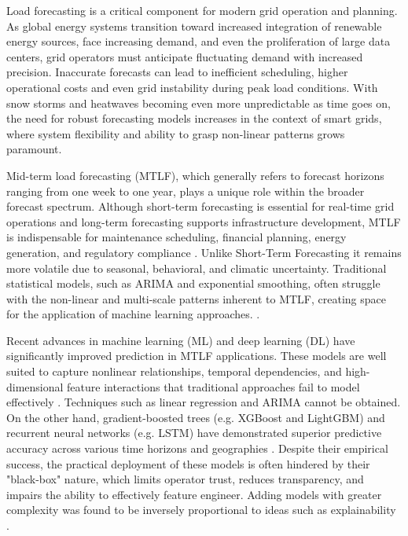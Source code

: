\documentclass[final,numbered]{ifacconf}
\begin{document}
Load forecasting is a critical component for modern grid operation and planning. As global energy systems transition toward increased integration of renewable energy sources, face increasing demand, and even the proliferation of large data centers, grid operators must anticipate fluctuating demand with increased precision. Inaccurate forecasts can lead to inefficient scheduling, higher operational costs and even grid instability during peak load conditions. With snow storms and heatwaves becoming even more unpredictable as time goes on, the need for robust forecasting models increases in the context of smart grids, where system flexibility and ability to grasp non-linear patterns grows paramount.

Mid-term load forecasting (MTLF), which generally refers to forecast horizons ranging from one week to one year, plays a unique role within the broader forecast spectrum. Although short-term forecasting is essential for real-time grid operations and long-term forecasting supports infrastructure development, MTLF is indispensable for maintenance scheduling, financial planning, energy generation, and regulatory compliance \cite{yin2023mid}. Unlike Short-Term Forecasting it remains more volatile  due to seasonal, behavioral, and climatic uncertainty. Traditional statistical models, such as ARIMA and exponential smoothing, often struggle with the non-linear and multi-scale patterns inherent to MTLF, creating space for the application of machine learning approaches. \cite{ghiassi2006medium, yin2023mid}.

Recent advances in machine learning (ML) and deep learning (DL) have significantly improved prediction in MTLF applications. These models are well suited to capture nonlinear relationships, temporal dependencies, and high-dimensional feature interactions that traditional approaches fail to model effectively \cite{yin2023mid, waheed2024empowering}. Techniques such as linear regression and ARIMA cannot be obtained. On the other hand, gradient-boosted trees (e.g. XGBoost and LightGBM) and recurrent neural networks (e.g. LSTM) have demonstrated superior predictive accuracy across various time horizons and geographies \cite{waheed2024empowering, ghiassi2006medium}. Despite their empirical success, the practical deployment of these models is often hindered by their "black-box" nature, which limits operator trust, reduces transparency, and impairs the ability to effectively feature engineer. Adding models with greater complexity was found to be inversely proportional to ideas such as explainability \cite{baur2024explainability}.
\end{document}
